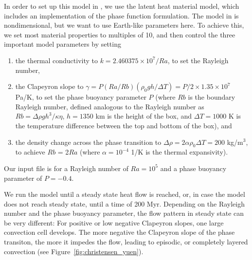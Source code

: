 In order to set up this model in \aspect{}, we use the latent heat material model, which includes an implementation of the phase function formulation. 
The model in \cite{CY85} is nondimensional, but we want to use Earth-like parameters here. To achieve this, we set most material properties to multiples of 10, and then control the three important model parameters by setting
\begin{enumerate}
  \item the thermal conductivity to $k = 2.460375 \times 10^7 / Ra$, to set the Rayleigh number,
  \item the Clapeyron slope to $\gamma = P (Ra/Rb) (\rho_0 g h/\Delta T) = P/2 \times 1.35 \times 10^7$ Pa/K, to set the phase buoyancy parameter $P$ (where $Rb$ is the boundary Rayleigh number, defined analogous to the Rayleigh number as $Rb = \Delta \rho g h^3 / \kappa \eta$, $h=1350$ km is the height of the box, and $\Delta T = 1000$ K is the temperature difference between the top and bottom of the box), and 
  \item the density change across the phase transition to $\Delta \rho = 2 \alpha \rho_0 \Delta T = 200$ kg/m$^3$, to achieve $Rb$ = 2$Ra$ (where $\alpha = 10^{-4}$ 1/K is the thermal expansivity). 
\end{enumerate}   

Our input file is for a Rayleigh number of $Ra = 10^5$ and a phase buoyancy parameter of $P=-0.4$.                                  



We run the model until a steady state heat flow is reached, or, in case the model does not reach steady state, until a time of 200 Myr. 
Depending on the Rayleigh number and the phase buoyancy parameter, the flow pattern in steady state can be very different: For positive or low negative Clapeyron slopes, one large convection cell develops. The more negative the Clapeyron slope of the phase transiton, the more it impedes the flow, leading to episodic, or completely layered convection (see Figure~\ref{fig:christensen_yuen}). 


